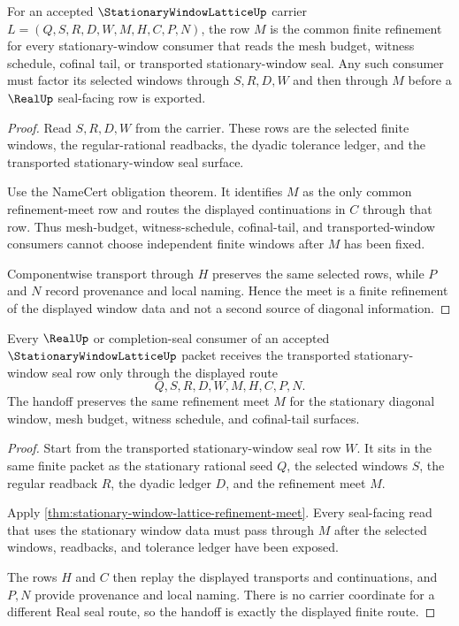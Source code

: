 \begin{theorem}
\label{thm:stationary-window-lattice-refinement-meet}
For an accepted $\StationaryWindowLatticeUp$ carrier $L=(Q,S,R,D,W,M,H,C,P,N)$, the row $M$ is the common finite refinement for every stationary-window consumer that reads the mesh budget, witness schedule, cofinal tail, or transported stationary-window seal. Any such consumer must factor its selected windows through $S,R,D,W$ and then through $M$ before a $\RealUp$ seal-facing row is exported.
\end{theorem}
\begin{proof}
Read $S,R,D,W$ from the carrier. These rows are the selected finite windows, the regular-rational readbacks, the dyadic tolerance ledger, and the transported stationary-window seal surface.

Use the NameCert obligation theorem. It identifies $M$ as the only common refinement-meet row and routes the displayed continuations in $C$ through that row. Thus mesh-budget, witness-schedule, cofinal-tail, and transported-window consumers cannot choose independent finite windows after $M$ has been fixed.

Componentwise transport through $H$ preserves the same selected rows, while $P$ and $N$ record provenance and local naming. Hence the meet is a finite refinement of the displayed window data and not a second source of diagonal information.
\end{proof}

\begin{theorem}
\label{thm:stationary-window-lattice-real-seal-handoff}
Every $\RealUp$ or completion-seal consumer of an accepted $\StationaryWindowLatticeUp$ packet receives the transported stationary-window seal row only through the displayed route
$$
Q,S,R,D,W,M,H,C,P,N.
$$
The handoff preserves the same refinement meet $M$ for the stationary diagonal window, mesh budget, witness schedule, and cofinal-tail surfaces.
\end{theorem}
\begin{proof}
Start from the transported stationary-window seal row $W$. It sits in the same finite packet as the stationary rational seed $Q$, the selected windows $S$, the regular readback $R$, the dyadic ledger $D$, and the refinement meet $M$.

Apply \autoref{thm:stationary-window-lattice-refinement-meet}. Every seal-facing read that uses the stationary window data must pass through $M$ after the selected windows, readbacks, and tolerance ledger have been exposed.

The rows $H$ and $C$ then replay the displayed transports and continuations, and $P,N$ provide provenance and local naming. There is no carrier coordinate for a different Real seal route, so the handoff is exactly the displayed finite route.
\end{proof}

